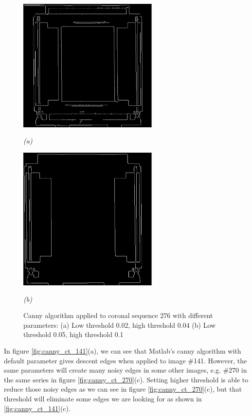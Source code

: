 \begin{figure}[htb]
  \begin{minipage}[b]{2.75in}
    \centering
    \centerline{\mbox{\includegraphics[width=2.75in]{data_extraction/images/canny/0.02_0.04/20121017_276.eps}}}
    \centerline{\emph{(a)}}
  \end{minipage}\medskip
  \begin{minipage}[b]{2.75in}
    \centering
    \centerline{\mbox{\includegraphics[width=2.75in]{data_extraction/images/canny/0.05_0.1/20121017_276.eps}}}
    \centerline{\emph{(b)}}
  \end{minipage}
  \caption{Canny algorithm applied to coronal sequence 276 with different parameters: (a) Low threshold 0.02, high threshold 0.04 (b) Low threshold 0.05, high threshold 0.1} 
  \label{fig:canny_ct_276}
\end{figure}

In figure \ref{fig:canny_ct_141}(a), we can see that Matlab's canny algorithm with default parameter gives 
descent edges when applied to image \#141. However, the same parameters will create many noisy edges in some other
images, e.g. \#270 in the same series in figure \ref{fig:canny_ct_270}(c). Setting higher threshold is able to
reduce those noisy edges as we can see in figure \ref{fig:canny_ct_270}(c), but that threshold will eliminate
some edges we are looking for as shown in \ref{fig:canny_ct_141}(c). 

